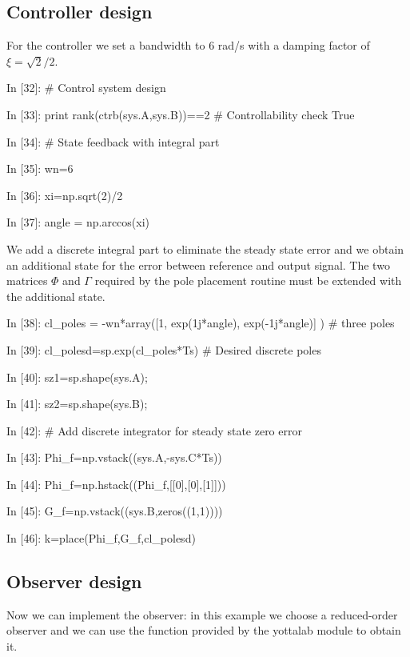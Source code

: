 \subsection{Controller design}
For the controller we set a bandwidth to $6$ rad/s with a damping factor of
$\xi=\sqrt{2}/2$.

\begin{code}

In [32]: # Control system design

In [33]: print rank(ctrb(sys.A,sys.B))==2    # Controllability check
True

In [34]: # State feedback with integral part

In [35]: wn=6

In [36]: xi=np.sqrt(2)/2

In [37]: angle = np.arccos(xi)
\end{code}

We add a discrete integral part to eliminate the steady state error and we 
obtain an additional state for the error between reference and output signal. 
The two matrices $\Phi$ and $\Gamma$ required by the pole placement routine 
must be extended with the additional state.

\begin{code}

In [38]: cl_poles = -wn*array([1, exp(1j*angle), exp(-1j*angle)] ) # three poles

In [39]: cl_polesd=sp.exp(cl_poles*Ts)    # Desired discrete poles

In [40]: sz1=sp.shape(sys.A);

In [41]: sz2=sp.shape(sys.B);

In [42]: # Add discrete integrator for steady state zero error

In [43]: Phi_f=np.vstack((sys.A,-sys.C*Ts))

In [44]: Phi_f=np.hstack((Phi_f,[[0],[0],[1]]))

In [45]: G_f=np.vstack((sys.B,zeros((1,1))))

In [46]: k=place(Phi_f,G_f,cl_polesd)
\end{code}

\subsection{Observer design}

Now we can implement the observer: in this example we choose a reduced-order 
observer and we can use the function provided by the yottalab module to obtain
it.

